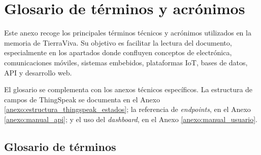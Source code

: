 \chapter{Glosario de términos y acrónimos}
\label{anexo:glosario_acronimos}

Este anexo recoge los principales términos técnicos y acrónimos utilizados en la memoria de TierraViva. Su objetivo es facilitar la lectura del documento, especialmente en los apartados donde confluyen conceptos de electrónica, comunicaciones móviles, sistemas embebidos, plataformas IoT, bases de datos, API y desarrollo web.

El glosario se complementa con los anexos técnicos específicos. La estructura de campos de ThingSpeak se documenta en el Anexo \ref{anexo:estructura_thingspeak_estados}; la referencia de \textit{endpoints}, en el Anexo \ref{anexo:manual_api}; y el uso del \textit{dashboard}, en el Anexo \ref{anexo:manual_usuario}.

\section{Glosario de términos}

